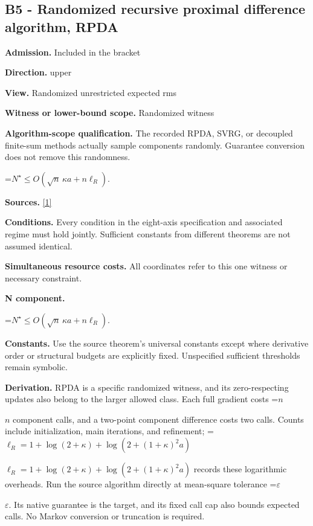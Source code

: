 \documentclass[10pt,a4paper]{article}
\newcommand{\AtlasMath}[1]{\par\begingroup\centering\setbox0=\hbox{$\displaystyle #1$}\ifdim\wd0>1.4\linewidth\typeout{ATLAS WIDE FORMULA: \the\wd0}\fi\ifdim\wd0>\linewidth\resizebox{\linewidth}{!}{\box0}\else\box0\fi\par\endgroup}
\newcommand{\AtlasInlineMath}[1]{\begingroup\setbox0=\hbox{$#1$}\ifdim\wd0>.4\linewidth\endgroup\AtlasMath{#1}\else\endgroup$#1$\fi}
\begin{document}
\subsection{B5 - Randomized recursive proximal difference algorithm, RPDA}


\textbf{Admission.} Included in the bracket



\textbf{Direction.} upper



\textbf{View.} Randomized unrestricted expected rms



\textbf{Witness or lower-bound scope.} Randomized witness



\textbf{Algorithm-scope qualification.} The recorded RPDA, SVRG, or decoupled finite-sum methods actually sample components randomly. Guarantee conversion does not remove this randomness.



\AtlasMath{N^\star\le O\!\left(\sqrt n\,\kappa a+n\ell_R\right).}


\textbf{Sources.} \href{https://arxiv.org/pdf/2610.04944v1}{[1]}



\textbf{Conditions.} Every condition in the eight-axis specification and associated regime must hold jointly. Sufficient constants from different theorems are not assumed identical.



\textbf{Simultaneous resource costs.} All coordinates refer to this one witness or necessary constraint.



\textbf{N component.}



\AtlasMath{N^\star\le O\!\left(\sqrt n\,\kappa a+n\ell_R\right).}


\textbf{Constants.} Use the source theorem’s universal constants except where derivative order or structural budgets are explicitly fixed. Unspecified sufficient thresholds remain symbolic.



\textbf{Derivation.} RPDA is a specific randomized witness, and its zero-respecting updates also belong to the larger allowed class. Each full gradient costs \AtlasInlineMath{n} component calls, and a two-point component difference costs two calls. Counts include initialization, main iterations, and refinement; \AtlasInlineMath{\ell_R=1+\log(2+\kappa)+\log(2+(1+\kappa)^2a)} records these logarithmic overheads. Run the source algorithm directly at mean-square tolerance \AtlasInlineMath{\varepsilon}. Its native guarantee is the target, and its fixed call cap also bounds expected calls. No Markov conversion or truncation is required.
\end{document}
